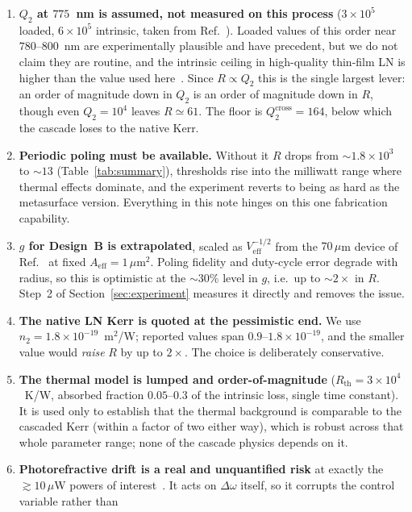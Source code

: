 \documentclass[11pt,a4paper]{article}
\newcommand{\Dom}{\Delta\omega}
\newcommand{\Veff}{V_{\text{eff}}}
\newcommand{\Aeff}{A_{\text{eff}}}
\begin{document}
\begin{enumerate}[leftmargin=1.8em,itemsep=3pt]
\item \textbf{$Q_2$ at $775$~nm is assumed, not measured on this
  process} ($3\times10^5$ loaded, $6\times10^5$ intrinsic, taken from
  Ref.~\cite{Lu2020}).  Loaded values of this order near $780$--$800$~nm
  are experimentally plausible and have precedent, but we do not claim
  they are routine, and the intrinsic ceiling in high-quality thin-film
  LN is higher than the value used here~\cite{Zhang2017}.  Since
  $R\propto Q_2$ this is the single largest lever: an order of magnitude
  down in $Q_2$ is an order of magnitude down in $R$, though even
  $Q_2=10^4$ leaves $R\simeq61$.  The floor is
  $Q_2^{\text{cross}}=164$, below which the cascade loses to the native
  Kerr.
\item \textbf{Periodic poling must be available.}  Without it
  $R$ drops from $\sim1.8\times10^3$ to $\sim13$
  (Table~\ref{tab:summary}), thresholds rise into the milliwatt range
  where thermal effects dominate, and the experiment reverts to being as
  hard as the metasurface version.  Everything in this note hinges on
  this one fabrication capability.
\item \textbf{$g$ for Design~B is extrapolated}, scaled as
  $\Veff^{-1/2}$ from the $70\,\mu$m device of Ref.~\cite{Lu2020} at
  fixed $\Aeff=1\,\mu$m$^2$.  Poling fidelity and duty-cycle error
  degrade with radius, so this is optimistic at the $\sim30\%$ level in
  $g$, i.e.\ up to $\sim2\times$ in $R$.  Step~2 of
  Section~\ref{sec:experiment} measures it directly and removes the
  issue.
\item \textbf{The native LN Kerr is quoted at the pessimistic end.}  We
  use $n_2=1.8\times10^{-19}$~m$^2$/W; reported values span
  $0.9$--$1.8\times10^{-19}$, and the smaller value would \emph{raise}
  $R$ by up to $2\times$.  The choice is deliberately conservative.
\item \textbf{The thermal model is lumped and order-of-magnitude}
  ($R_{\text{th}}=3\times10^4$~K/W, absorbed fraction $0.05$--$0.3$ of
  the intrinsic loss, single time constant).  It is used only to
  establish that the thermal background is comparable to the cascaded
  Kerr (within a factor of two either way), which is robust across that
  whole parameter range;
  none of the cascade physics depends on it.
\item \textbf{Photorefractive drift is a real and unquantified risk} at
  exactly the $\gtrsim10\,\mu$W powers of interest~\cite{Lu2020}.  It
  acts on $\Dom$ itself, so it corrupts the control variable rather than

\end{enumerate}
\end{document}

